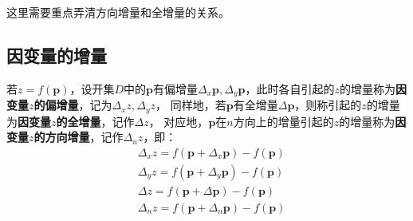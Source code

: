 \begin{tcolorbox}
这里需要重点弄清方向增量和全增量的关系。
\end{tcolorbox}

\subsection{因变量的增量}

\begin{definition}[因变量的增量]
若$z=f\left( \boldsymbol{p} \right) $，设开集$D$中的$\boldsymbol{p}$有偏增量$\Delta _x\boldsymbol{p},\Delta _y\boldsymbol{p}$，此时各自引起的$z$的增量称为{\bf 因变量$z$的偏增量}，记为$\Delta _xz,\Delta _yz$，
同样地，若$\boldsymbol{p}$有全增量$\Delta \boldsymbol{p}$，则称引起的$z$的增量为{\bf 因变量$z$的全增量}，记作$\Delta z$，
对应地，$\boldsymbol{p}$在$n$方向上的增量引起的$z$的增量称为{\bf 因变量$z$的方向增量}，记作$\Delta _nz$，即：
\begin{align*}
&\Delta _xz=f\left( \boldsymbol{p}+\Delta _x\boldsymbol{p} \right) -f\left( \boldsymbol{p} \right) \\
&\Delta _yz=f\left( \boldsymbol{p}+\Delta _y\boldsymbol{p} \right) -f\left( \boldsymbol{p} \right) \\
&\Delta z=f\left( \boldsymbol{p}+\Delta \boldsymbol{p} \right) -f\left( \boldsymbol{p} \right) \\
&\Delta _nz=f\left( \boldsymbol{p}+\Delta _n\boldsymbol{p} \right) -f\left( \boldsymbol{p} \right)
\end{align*}
\end{definition}





